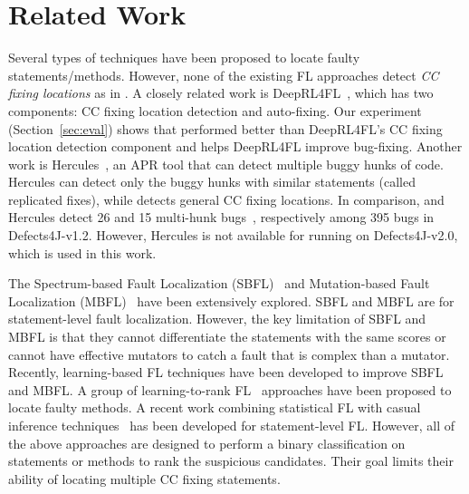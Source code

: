 \section{Related Work}

Several types of techniques have been proposed to locate faulty
statements/methods. However, none of the existing FL approaches detect
{\em CC fixing locations} as in {\tool}. A closely related work is
DeepRL4FL~\cite{icse21-fl}, which has two components: CC fixing
location detection and auto-fixing. Our experiment
(Section~\ref{sec:eval}) shows that {\tool} performed better than
DeepRL4FL's CC fixing location detection component and helps DeepRL4FL
improve bug-fixing. Another work is
Hercules~\cite{hercules-icse19}, an APR tool that can detect multiple
buggy hunks of code. Hercules can detect only the buggy hunks with
similar statements (called replicated fixes), while {\tool} detects
general CC fixing locations. In comparison, {\tool} and Hercules
detect 26 and 15 multi-hunk bugs~\cite{hercules-icse19}, respectively
among 395 bugs in Defects4J-v1.2. However, Hercules is not available
for running on Defects4J-v2.0, which is used in this work.

The Spectrum-based Fault Localization
(SBFL)~\cite{zhang2011localizing, abreu2007accuracy,
  jones2005empirical, abreu2006evaluation, naish2011model,
  wong2007effective, liblit-pldi05, lucia2014extended} and
Mutation-based Fault Localization (MBFL)~\cite{Metallaxis, MUSE,
  zhang2013injecting, budd1981mutation, zhang2010test, musco2017large}
have been extensively explored. SBFL and MBFL are for statement-level
fault localization. However, the key limitation of SBFL and MBFL is
that they cannot differentiate the statements with the same scores or
cannot have effective mutators to catch a fault that is complex than a
mutator. Recently, learning-based FL techniques have been developed to
improve SBFL and MBFL.
A group of learning-to-rank
FL~\cite{MULTRIC,TraPT,b2016learning,sohn2017fluccs} approaches have
been proposed to locate faulty methods.
A recent work combining statistical FL with casual inference
techniques~\cite{kuccuk2021improving} has been developed for
statement-level FL. However, all of the above approaches are designed
to perform a binary classification on statements or methods to rank
the suspicious candidates. Their goal limits their ability of locating
multiple CC fixing statements.

